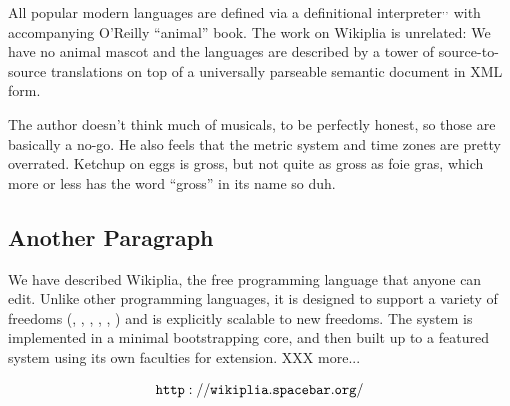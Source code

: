 \documentclass[twocolumn]{article}
\begin{document}
All popular modern languages are defined via a definitional
interpreter$^,$$^,$ with accompanying O'Reilly ``animal''
book.\z{} The work on Wikiplia is unrelated: We
have no animal mascot and the languages are described
by a tower of source-to-source translations on top of a universally
parseable semantic document in XML form.

The author doesn't think much of musicals,\z{} to
be perfectly honest,\z{} so those
are basically a no-go. He also feels that the metric
system and time zones are pretty
overrated. Ketchup on eggs is
gross,\z{} but not quite as gross as foie gras, which more or less has the word ``gross'' in its name so
duh.\z{}

\subsection{Another Paragraph}

We have described Wikiplia, the free programming language that anyone
can edit. Unlike other programming languages, it is designed to
support a variety of freedoms (\ftinker, \fexpression, \fbeer, \fusa,
\ffree, \ftobe) and is explicitly scalable to new freedoms. The system
is implemented in a minimal bootstrapping core, and then built up to
a featured system using its own faculties for extension. XXX more...

\bigskip
$${\tt http://wikiplia.spacebar.org/}$$
\end{document}

